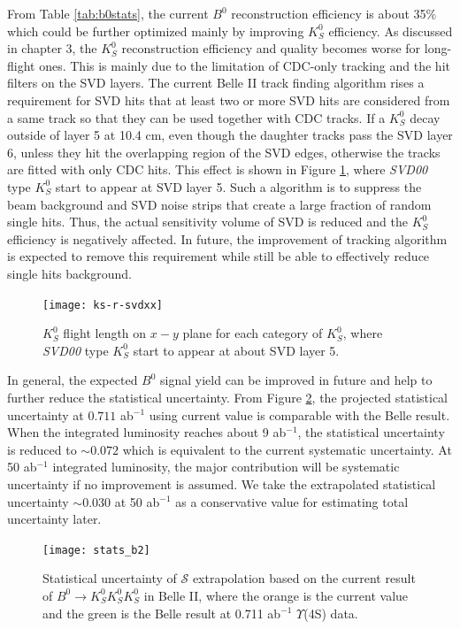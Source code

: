 From Table \ref{tab:b0stats}, the current $B^0$ reconstruction efficiency is about 35\% which could be further optimized mainly by improving $K_S^0$ efficiency. As discussed in chapter 3, the $K_S^0$ reconstruction efficiency and quality becomes worse for long-flight ones. This is mainly due to the limitation of CDC-only tracking and the hit filters on the SVD layers. The current Belle II track finding algorithm rises a requirement for SVD hits that at least two or more SVD hits are considered from a same track so that they can be used together with CDC tracks. If a $K_S^0$ decay outside of layer 5 at 10.4 cm, even though the daughter tracks pass the SVD layer 6, unless they hit the overlapping region of the SVD edges, otherwise the tracks are fitted with only CDC hits. This effect is shown in Figure \ref{fig:svd-r-xx}, where \textit{SVD00} type $K_S^0$ start to appear at SVD layer 5. Such a algorithm is to suppress the beam background and SVD noise strips that create a large fraction of random single hits. Thus, the actual sensitivity volume of SVD is reduced and the $K_S^0$ efficiency is negatively affected. 
In future, the improvement of tracking algorithm is expected to remove this requirement while still be able to effectively reduce single hits background.

\begin{figure}[htpb]
	\centering
	\texttt{[image: ks-r-svdxx]}
	\caption{$K_S^0$ flight length on $x-y$ plane for each category of $K_S^0$, where \textit{SVD00} type $K_S^0$ start to appear at about SVD layer 5.}
	\label{fig:svd-r-xx}
\end{figure}




In general, the expected $B^0$ signal yield can be improved in future and help to further reduce the statistical uncertainty. From Figure \ref{fig:stats_future}, the projected statistical uncertainty at $0.711$ ab$^{-1}$ using current value is comparable with the Belle result. 
When the integrated luminosity reaches about 9 ab$^{-1}$, the statistical uncertainty is reduced to $\sim 0.072$ which is equivalent to the current systematic uncertainty. At 50 ab$^{-1}$ integrated luminosity, the major contribution will be systematic uncertainty if no improvement is assumed. We take the extrapolated statistical uncertainty $\sim 0.030$ at 50 ab$^{-1}$ as a conservative value for estimating total uncertainty later.

\begin{figure}[htpb]
\centering
\texttt{[image: stats\_b2]}
\caption{Statistical uncertainty of $\mathcal{S}$ extrapolation based on the current result of $B^0 \to K_S^0  K_S^0  K_S^0$ in Belle II, where the orange is the current value and the green is the Belle result at 0.711 ab$^{-1}$ $\Upsilon$(4S) data.}
\label{fig:stats_future}
\end{figure}

